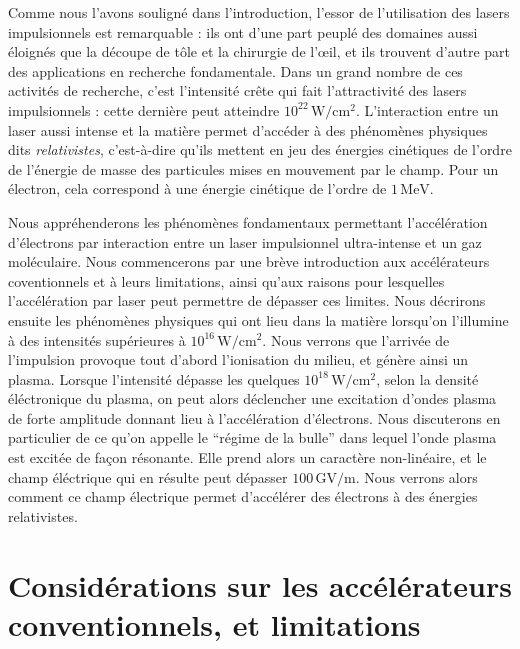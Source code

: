 \documentclass[a4paper]{book}
\begin{document}
Comme nous l'avons souligné dans l'introduction, l'essor de l'utilisation des lasers impulsionnels est remarquable : ils ont d'une part peuplé des domaines aussi éloignés que la découpe de tôle et la chirurgie de l'\oe{}il, et ils trouvent d'autre part des applications en recherche fondamentale. Dans un grand nombre de ces activités de recherche, c'est l'intensité crête qui fait l'attractivité des lasers impulsionnels : cette dernière peut atteindre $10^{22}\,\mathrm{W/cm^2}$. L'interaction entre un laser aussi intense et la matière permet d'accéder à des phénomènes physiques dits \textit{relativistes}, c'est-à-dire qu'ils mettent en jeu des énergies cinétiques de l'ordre de l'énergie de masse des particules mises en mouvement par le champ. Pour un électron, cela correspond à une énergie cinétique de l'ordre de $1\,\mathrm{MeV}$. 


Nous appréhenderons les phénomènes fondamentaux permettant l'accélération d'électrons par interaction entre un laser impulsionnel ultra-intense et un gaz moléculaire. Nous commencerons par une brève introduction aux accélérateurs coventionnels et à leurs limitations, ainsi qu'aux raisons pour lesquelles l'accélération par laser peut permettre de dépasser ces limites. Nous décrirons ensuite les phénomènes physiques qui ont lieu dans la matière lorsqu'on l'illumine à des intensités supérieures à $10^{16}\,\mathrm{W/cm^2}$. Nous verrons que l'arrivée de l'impulsion provoque tout d'abord l'ionisation du milieu, et génère ainsi un plasma. Lorsque l'intensité dépasse les quelques $10^{18}\,\mathrm{W/cm^2}$, selon la densité éléctronique du plasma, on peut alors déclencher une excitation d'ondes plasma de forte amplitude donnant lieu à l'accélération d'électrons. Nous discuterons en particulier de ce qu'on appelle le ``régime de la bulle'' dans lequel l'onde plasma est excitée de façon résonante. Elle prend alors un caractère non-linéaire, et le champ éléctrique qui en résulte peut dépasser $100\,\textrm{GV/m}$. Nous verrons alors comment ce champ électrique permet d'accélérer des électrons à des énergies relativistes.

\section{Considérations sur les accélérateurs conventionnels, et limitations}
\end{document}
